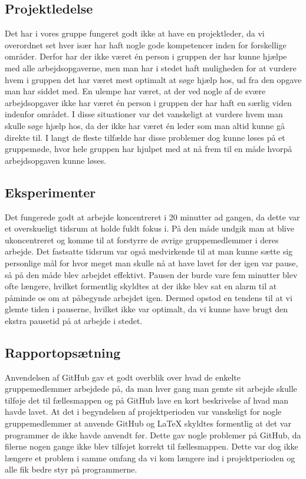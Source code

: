\subsection{Projektledelse}
Det har i vores gruppe fungeret godt ikke at have en projektleder, da vi overordnet set hver især har haft nogle gode kompetencer inden for forskellige områder. Derfor har der ikke været én person i gruppen der har kunne hjælpe med alle arbejdsopgaverne, men man har i stedet haft muligheden for at vurdere hvem i gruppen det har været mest optimalt at søge hjælp hos, ud fra den opgave man har siddet med. 
En ulempe har været, at der ved nogle af de svære arbejdsopgaver ikke har været én person i gruppen der har haft en særlig viden indenfor området. I disse situationer var det vanskeligt at vurdere hvem man skulle søge hjælp hos, da der ikke har været én leder som man altid kunne gå direkte til. I langt de fleste tilfælde har disse problemer dog kunne løses på et gruppemøde, hvor hele gruppen har hjulpet med at nå frem til en måde hvorpå arbejdsopgaven kunne løses.

\subsection{Eksperimenter}
Det fungerede godt at arbejde koncentreret i 20 minutter ad gangen, da dette var et overskueligt tidsrum at holde fuldt fokus i. På den måde undgik man at blive ukoncentreret og komme til at forstyrre de øvrige gruppemedlemmer i deres arbejde. Det fastsatte tidsrum var også medvirkende til at man kunne sætte sig personlige mål for hvor meget man skulle nå at have lavet før der igen var pause, så på den måde blev arbejdet effektivt. 
Pausen der burde vare fem minutter blev ofte længere, hvilket formentlig skyldtes at der ikke blev sat en alarm til at påminde os om at påbegynde arbejdet igen. Dermed opstod en tendens til at vi glemte tiden i pauserne, hvilket ikke var optimalt, da vi kunne have brugt den ekstra pausetid på at arbejde i stedet.

\subsection{Rapportopsætning}
Anvendelsen af GitHub gav et godt overblik over hvad de enkelte gruppemedlemmer arbejdede på, da man hver gang man gemte sit arbejde skulle tilføje det til fællesmappen og på GitHub lave en kort beskrivelse af hvad man havde lavet. 
At det i begyndelsen af projektperioden var vanskeligt for nogle gruppemedlemmer at anvende GitHub og LaTeX skyldtes formentlig at det var programmer de ikke havde anvendt før. Dette gav nogle problemer på GitHub, da filerne nogen gange ikke blev tilføjet korrekt til fællesmappen. Dette var dog ikke længere et problem i samme omfang da vi kom længere ind i projektperioden og alle fik bedre styr på programmerne. 